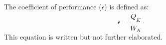 The coefficient of performance (\(\epsilon\)) is defined as:  
\[
\epsilon = \frac{\dot{Q}_K}{\dot{W}_K}
\]  
This equation is written but not further elaborated.